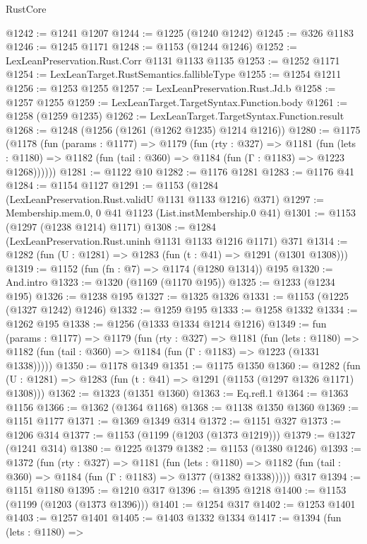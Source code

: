\begin{lexlean}{RustCore}
\begin{coremodule}
@1242 := @1241 @1207
@1244 := @1225 (@1240 @1242)
@1245 := @326 @1183
@1246 := @1245 @1171
@1248 := @1153 (@1244 @1246)
@1252 := LexLeanPreservation.Rust.Corr @1131 @1133 @1135
@1253 := @1252 @1171
@1254 := LexLeanTarget.RustSemantics.fallibleType
@1255 := @1254 @1211
@1256 := @1253 @1255
@1257 := LexLeanPreservation.Rust.Jd.b
@1258 := @1257 @1255
@1259 := LexLeanTarget.TargetSyntax.Function.body
@1261 := @1258 (@1259 @1235)
@1262 := LexLeanTarget.TargetSyntax.Function.result
@1268 := @1248 (@1256 (@1261 (@1262 @1235) @1214 @1216))
@1280 := @1175
    (@1178
      (fun (params : @1177) =>
      @1179
        (fun (rty : @327) =>
        @1181
          (fun (lets : @1180) =>
          @1182 (fun (tail : @360) => @1184 (fun (Γ : @1183) => @1223 @1268))))))
@1281 := @1122 @10
@1282 := @1176 @1281
@1283 := @1176 @41
@1284 := @1154 @1127
@1291 := @1153 (@1284 (LexLeanPreservation.Rust.validU @1131 @1133 @1216) @371)
@1297 := Membership.mem.{0, 0} @41 @1123 (List.instMembership.{0} @41)
@1301 := @1153 (@1297 (@1238 @1214) @1171)
@1308 := @1284 (LexLeanPreservation.Rust.uninh @1131 @1133 @1216 @1171) @371
@1314 := @1282 (fun (U : @1281) => @1283 (fun (t : @41) => @1291 (@1301 @1308)))
@1319 := @1152 (fun (fn : @7) => @1174 (@1280 @1314)) @195
@1320 := And.intro
@1323 := @1320 (@1169 (@1170 @195))
@1325 := @1233 (@1234 @195)
@1326 := @1238 @195
@1327 := @1325 @1326
@1331 := @1153 (@1225 (@1327 @1242) @1246)
@1332 := @1259 @195
@1333 := @1258 @1332
@1334 := @1262 @195
@1338 := @1256 (@1333 @1334 @1214 @1216)
@1349 := fun (params : @1177) =>
  @1179
    (fun (rty : @327) =>
    @1181
      (fun (lets : @1180) =>
      @1182 (fun (tail : @360) => @1184 (fun (Γ : @1183) => @1223 (@1331 @1338)))))
@1350 := @1178 @1349
@1351 := @1175 @1350
@1360 := @1282 (fun (U : @1281) => @1283 (fun (t : @41) => @1291 (@1153 (@1297 @1326 @1171) @1308)))
@1362 := @1323 (@1351 @1360)
@1363 := Eq.refl.{1}
@1364 := @1363 @1156
@1366 := @1362 (@1364 @1168)
@1368 := @1138 @1350 @1360
@1369 := @1151 @1177
@1371 := @1369 @1349 @314
@1372 := @1151 @327
@1373 := @1206 @314
@1377 := @1153 (@1199 (@1203 (@1373 @1219)))
@1379 := @1327 (@1241 @314)
@1380 := @1225 @1379
@1382 := @1153 (@1380 @1246)
@1393 := @1372
    (fun (rty : @327) =>
    @1181
      (fun (lets : @1180) =>
      @1182 (fun (tail : @360) => @1184 (fun (Γ : @1183) => @1377 (@1382 @1338)))))
    @317
@1394 := @1151 @1180
@1395 := @1210 @317
@1396 := @1395 @1218
@1400 := @1153 (@1199 (@1203 (@1373 @1396)))
@1401 := @1254 @317
@1402 := @1253 @1401
@1403 := @1257 @1401
@1405 := @1403 @1332 @1334
@1417 := @1394
    (fun (lets : @1180) =>

\end{coremodule}
\end{lexlean}
